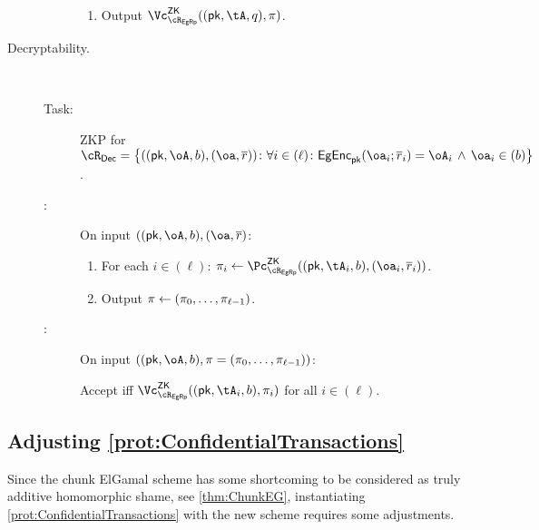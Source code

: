 \begin{description}
\begin{description}
\begin{enumerate}
		\item  Output $\vZK{\rEgRp}((\pk,\tA,q), \pi)$.
		
	\end{enumerate}
\end{description}
 


\item[Decryptability.]  ~


\begin{description}
	\item[Task:] ZKP for $\rDec =\rDecDef$.
	
	\item[\Pc:] On  input  $((\pk,\oA,b),(\oa,\orr)$:
	
	\begin{enumerate}
		\item For each $i\in (\ell)$: $\pi_i \asn \pZK{\rEgRp}((\pk,\tA_i,b), (\oa_i,\orr_i))$.
		\item Output $\pi \leftarrow (\pi_0,\ldots, \pi_{\ell-1})$.
	\end{enumerate}
	 
	 
	 	\item[\Vc:] On  input  $((\pk,\oA,b), \pi= (\pi_0,\ldots, \pi_{\ell-1}))$:
	 
	 Accept iff  $\vZK{\rEgRp}((\pk,\tA_i,b), \pi_i)$ for all $i\in (\ell)$.
	 
	 
\end{description}


\end{description}


\subsection{Adjusting  \cref{prot:ConfidentialTransactions}}\label{sec:ChanksEG:Adjusting}
Since the chunk ElGamal  scheme has some shortcoming to be considered as truly additive  homomorphic shame, see \cref{thm:ChunkEG}, instantiating \cref{prot:ConfidentialTransactions} with the new scheme  requires some adjustments.

